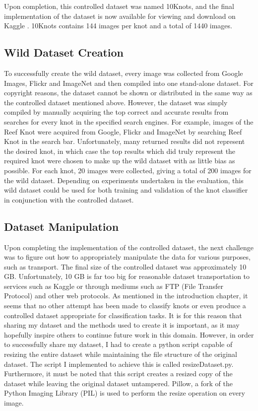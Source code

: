 \documentclass{l4proj}
\begin{document}
Upon completion, this controlled dataset was named 10Knots, and the final implementation of the dataset is now available for viewing and download on Kaggle \cite{JosephCameron}. 10Knots contains 144 images per knot and a total of 1440 images.

\subsection{Wild Dataset Creation}
To successfully create the wild dataset, every image was collected from Google Images, Flickr and ImageNet and then compiled into one stand-alone dataset.
For copyright reasons, the dataset cannot be shown or distributed in the same way as the controlled dataset mentioned above. 
However, the dataset was simply compiled by manually acquiring the top correct and accurate results from searches for every knot in the specified search engines.
For example, images of the Reef Knot were acquired from Google, Flickr and ImageNet by searching Reef Knot in the search bar.
Unfortunately, many returned results did not represent the desired knot, in which case the top results which did truly represent the required knot were chosen to make up the wild dataset with as little bias as possible.
For each knot, 20 images were collected, giving a total of 200 images for the wild dataset.
Depending on experiments undertaken in the evaluation, this wild dataset could be used for both training and validation of the knot classifier in conjunction with the controlled dataset.

\subsection{Dataset Manipulation}
Upon completing the implementation of the controlled dataset, the next challenge was to figure out how to appropriately manipulate the data for various purposes, such as transport.
The final size of the controlled dataset was approximately 10 GB.
Unfortunately, 10 GB is far too big for reasonable dataset transportation to services such as Kaggle or through mediums such as FTP (File Transfer Protocol) and other web protocols.
As mentioned in the introduction chapter, it seems that no other attempt has been made to classify knots or even produce a controlled dataset appropriate for classification tasks.
It is for this reason that sharing my dataset and the methods used to create it is important, as it may hopefully inspire others to continue future work in this domain.
However, in order to successfully share my dataset, I had to create a python script capable of resizing the entire dataset while maintaining the file structure of the original dataset.
The script I implemented to achieve this is called resizeDataset.py.
Furthermore, it must be noted that this script creates a resized copy of the dataset while leaving the original dataset untampered.
Pillow, a fork of the Python Imaging Library (PIL) \cite{pillowPython} is used to perform the resize operation on every image.
\end{document}
